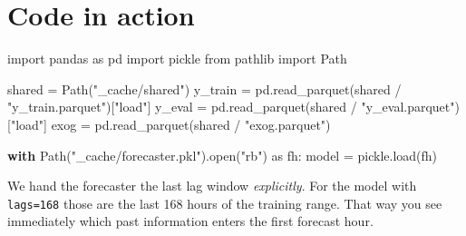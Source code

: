 \documentclass[
  english,
  letterpaper,
]{scrbook}
\newenvironment{Shaded}{\begin{snugshade}}{\end{snugshade}}
\newcommand{\BuiltInTok}[1]{\textcolor[rgb]{0.00,0.23,0.31}{#1}}
\newcommand{\ControlFlowTok}[1]{\textcolor[rgb]{0.00,0.23,0.31}{\textbf{#1}}}
\newcommand{\ImportTok}[1]{\textcolor[rgb]{0.00,0.46,0.62}{#1}}
\newcommand{\NormalTok}[1]{\textcolor[rgb]{0.00,0.23,0.31}{#1}}
\newcommand{\OperatorTok}[1]{\textcolor[rgb]{0.37,0.37,0.37}{#1}}
\newcommand{\StringTok}[1]{\textcolor[rgb]{0.13,0.47,0.30}{#1}}
\begin{document}
\section{Code in action}\label{code-in-action-4}

\protect{}\label{load-model}
\begin{Shaded}
\begin{Highlighting}[]
\ImportTok{import}\NormalTok{ pandas }\ImportTok{as}\NormalTok{ pd}
\ImportTok{import}\NormalTok{ pickle}
\ImportTok{from}\NormalTok{ pathlib }\ImportTok{import}\NormalTok{ Path}

\NormalTok{shared }\OperatorTok{=}\NormalTok{ Path(}\StringTok{"\_cache/shared"}\NormalTok{)}
\NormalTok{y\_train }\OperatorTok{=}\NormalTok{ pd.read\_parquet(shared }\OperatorTok{/} \StringTok{"y\_train.parquet"}\NormalTok{)[}\StringTok{"load"}\NormalTok{]}
\NormalTok{y\_eval  }\OperatorTok{=}\NormalTok{ pd.read\_parquet(shared }\OperatorTok{/} \StringTok{"y\_eval.parquet"}\NormalTok{)[}\StringTok{"load"}\NormalTok{]}
\NormalTok{exog    }\OperatorTok{=}\NormalTok{ pd.read\_parquet(shared }\OperatorTok{/} \StringTok{"exog.parquet"}\NormalTok{)}

\ControlFlowTok{with}\NormalTok{ Path(}\StringTok{"\_cache/forecaster.pkl"}\NormalTok{).}\BuiltInTok{open}\NormalTok{(}\StringTok{"rb"}\NormalTok{) }\ImportTok{as}\NormalTok{ fh:}
\NormalTok{    model }\OperatorTok{=}\NormalTok{ pickle.load(fh)}
\end{Highlighting}
\end{Shaded}

We hand the forecaster the last lag window \emph{explicitly}. For the
model with \texttt{lags=168} those are the last 168 hours of the
training range. That way you see immediately which past information
enters the first forecast hour.
\end{document}
